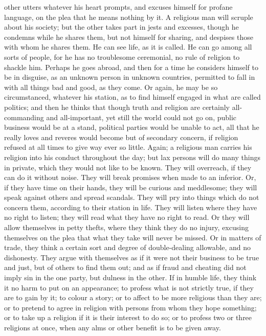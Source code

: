 other utters whatever his heart prompts, and excuses himself for
profane language, on the plea that he means nothing by it. A religious
man will scruple about his society; but the other takes part in jests
and excesses, though he condemns while he shares them, but not himself
for sharing, and despises those with whom he shares them. He can see
life, as it is called. He can go among all sorts of people, for he has
no troublesome ceremonial, no rule of religion to shackle him. Perhaps
he goes abroad, and then for a time he considers himself to be in
disguise, as an unknown person in unknown countries, permitted to fall
in with all things bad and good, as they come. Or again, he may be so
circumstanced, whatever his station, as to find himself engaged in
what are called politics; and then he thinks that though truth and
religion are certainly all-commanding and all-important, yet still the
world could not go on, public business would be at a stand, political
parties would be unable to act, all that he really loves and reveres
would become but of secondary concern, if religion refused at all
times to give way ever so little. Again; a religious man carries his
religion into his conduct throughout the day; but lax persons will do
many things in private, which they would not like to be known. They
will overreach, if they can do it without noise. They will break
promises when made to an inferior. Or, if they have time on their
hands, they will be curious and meddlesome; they will speak against
others and spread scandals. They will pry into things which do not
concern them, according to their station in life. They will listen
where they have no right to listen; they will read what they have no
right to read. Or they will allow themselves in petty thefts, where
they think they do no injury, excusing themselves on the plea that
what they take will never be missed. Or in matters of trade, they
think a certain sort and degree of double-dealing allowable, and no
dishonesty. They argue with themselves as if it were not their
business to be true and just, but of others to find them out; and as
if fraud and cheating did not imply sin in the one party, but dulness
in the other. If in humble life, they think it no harm to put on an
appearance; to profess what is not strictly true, if they are to gain
by it; to colour a story; or to affect to be more religious than they
are; or to pretend to agree in religion with persons from whom they
hope something; or to take up a religion if it is their interest to do
so; or to profess two or three religions at once, when any alms or
other benefit is to be given away.

